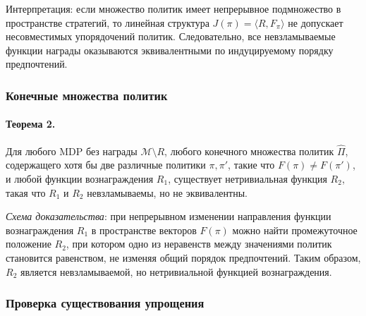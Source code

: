 Интерпретация: если множество политик имеет непрерывное подмножество в пространстве стратегий, то линейная структура $J(\pi) = \langle R, F_\pi \rangle$ не допускает несовместимых упорядочений политик. Следовательно, все невзламываемые функции награды оказываются эквивалентными по индуцируемому порядку предпочтений.


\subsubsection{Конечные множества политик}

\begin{theorem}
\label{th:finite_unhackable}
\paragraph{Теорема 2.} Для любого MDP без награды $\mathcal{M} \setminus R$, любого конечного множества политик $\widehat{\Pi}$, содержащего хотя бы две различные политики $\pi, \pi'$, такие что $F(\pi) \ne F(\pi')$, 
и любой функции вознаграждения $R_1$, существует нетривиальная функция $R_2$, такая что $R_1$ и $R_2$ невзламываемы, но не эквивалентны.
\end{theorem}

\emph{Схема доказательства}: при непрерывном изменении направления функции вознаграждения $R_1$ в пространстве векторов $F(\pi)$ можно найти промежуточное положение $R_2$, при котором одно из неравенств между значениями политик становится равенством, не изменяя общий порядок предпочтений. Таким образом, $R_2$ является невзламываемой, но нетривиальной функцией вознаграждения.


\subsubsection{Проверка существования упрощения}


